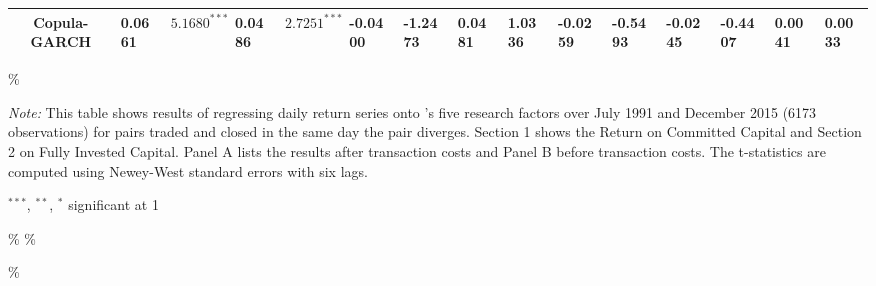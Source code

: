 \documentclass[a4paper]{article}
\begin{document}
\begin{sidewaystable}
\begin{threeparttable}[H]
\begin{tabularx}{\textwidth}{@{\extracolsep{\fill}}lllllllllllllll@{}}
				\multicolumn{1}{c}{Copula-GARCH} & 0.0661 & $5.1680^{***}$ & 0.0486 & $2.7251^{***}$ & -0.0400 & -1.2473 & 0.0481 & 1.0336 & -0.0259 & -0.5493 & -0.0245 & -0.4407 & 0.0041 & 0.0033 \\
				\bottomrule
			\end{tabularx}\%
			\begin{tablenotes}
				\item \textit{Note:} \scriptsize  This table shows results of regressing daily return series onto \citet*{ff15}'s five research factors over July 1991 and December 2015 (6173 observations) for pairs traded and closed in the same day the pair diverges. Section 1 shows the Return on Committed Capital and Section 2 on Fully Invested Capital. Panel A lists the results after transaction costs and Panel B before transaction costs. The t-statistics are computed using Newey-West standard errors with six lags.
				\item \scriptsize $^{\ast\ast\ast}$, $^{\ast\ast}$, $^{\ast}$  significant at 1\\%
			\end{tablenotes}
		\end{threeparttable}\%
		\label{tab:table109}\%
	\end{sidewaystable}\%
	
\end{document}
